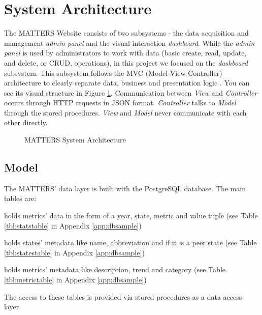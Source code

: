 	\section{System Architecture}
	
		The MATTERS Website consists of two subsystems - the data acquisition 
		and management \emph{admin panel} and the visual-interaction 
		\emph{dashboard}. While the \emph{admin panel} is used by administrators
		to work with data (basic create, read, update, and delete, or CRUD, 
		operations), in this project we focused on the \emph{dashboard} 
		subsystem. This subsystem follows the MVC (Model-View-Controller) 
		architecture to clearly separate data, business and presentation logic \cite{mvc}.
		You can see its visual structure in Figure \ref{fig:sysarch}. 
		Communication between \emph{View} and \emph{Controller} occurs through 
		HTTP requests in JSON format. \emph{Controller} talks to \emph{Model} 
		through the stored procedures. \emph{View} and \emph{Model} never 
		communicate with each other directly.
		
		\begin{figure}[t]
			\centering
			
			\caption{MATTERS System Architecture}
			\label{fig:sysarch}
		\end{figure}
		
		
		\subsection{Model}
			
			The MATTERS' data layer is built with the PostgreSQL database. The 
			main tables are:
			
			\begin{description}[itemsep=-1.5mm, align=right,labelwidth=3cm]
				\item [Statistics]
					holds metrics' data in the form of a year, state, metric and 
					value tuple (see Table \ref{tbl:statstable} in Appendix \ref{app:dbsample})
				\item [States]
					holds states' metadata like name, abbreviation and if it is 
					a peer state (see Table \ref{tbl:statestable} in Appendix \ref{app:dbsample})
				\item [Metrics]
					holds metrics' metadata like description, trend and 
					category (see Table \ref{tbl:metrictable} in Appendix \ref{app:dbsample})
			\end{description}
			
			The access to these tables is provided via stored procedures as a 
			data access layer.
			
